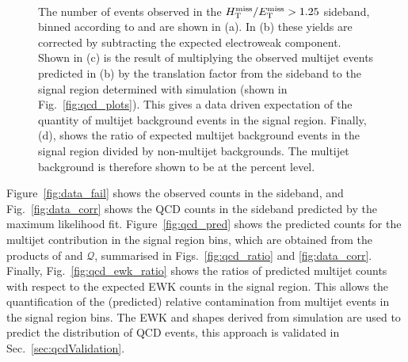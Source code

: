 \begin{figure}[!h]
{  } \\
  \caption{The number of events observed in the $\mbox{$\mbox{$H_{\rm T}^{\rm miss}$} / \mbox{$E_\text{T}^{\rm miss}$}$}>1.25$ sideband, 
    binned according to \njet and \scalht are shown in (a). In
    (b) these yields are corrected by subtracting the expected
    electroweak component. Shown in
    (c) is the result of multiplying the observed multijet events predicted
    in (b) by the translation factor from the sideband to the signal
    region determined with simulation (shown in
    Fig.~\ref{fig:qcd_plots}). This gives a data driven expectation of
    the quantity of multijet background events in the signal region. 
    Finally, (d), shows the ratio of expected
    multijet background events in the signal region divided by
    non-multijet backgrounds. The multijet background is therefore
    shown to be at the percent level.}
  \label{fig:qcd_plots2}
\end{figure}

Figure~\ref{fig:data_fail} shows the observed counts in the \mhtmet
sideband, and Fig.~\ref{fig:data_corr} shows the QCD counts 
in the sideband predicted by the maximum likelihood fit.
Figure~\ref{fig:qcd_pred} shows the predicted counts for the multijet
contribution in the signal region bins, which are obtained from the
products of \rmhtmet and $\mathcal{Q}$, summarised in
Figs.~\ref{fig:qcd_ratio} and \ref{fig:data_corr}. Finally,
Fig.~\ref{fig:qcd_ewk_ratio} shows the ratios of predicted multijet
counts with respect to the expected EWK counts in the signal region.
This allows the quantification of
the (predicted) relative contamination from multijet events in the
signal region bins. The EWK \mht and \nb shapes derived from
simulation are used to predict the distribution 
of QCD events, this approach is validated in
Sec.~\ref{sec:qcdValidation}. 

